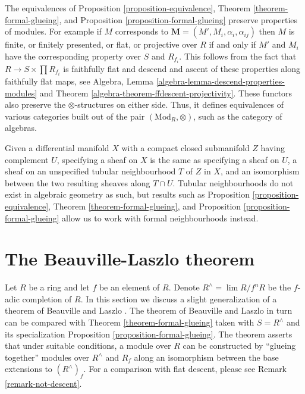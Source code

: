 \begin{remark}
\label{remark-formal-glueing-algebras}
The equivalences of
Proposition \ref{proposition-equivalence},
Theorem \ref{theorem-formal-glueing}, and
Proposition \ref{proposition-formal-glueing}
preserve properties of modules. For example if
$M$ corresponds to $\mathbf{M} = (M', M_i, \alpha_i, \alpha_{ij})$
then $M$ is finite, or finitely presented, or flat, or projective over $R$
if and only if $M'$ and $M_i$ have the corresponding property
over $S$ and $R_{f_i}$. This follows from the fact that
$R \to S \times \prod R_{f_i}$ is faithfully flat and
descend and ascent of these properties along faithfully flat maps, see
Algebra, Lemma \ref{algebra-lemma-descend-properties-modules} and
Theorem \ref{algebra-theorem-ffdescent-projectivity}.
These functors also preserve the $\otimes$-structures on either side.
Thus, it defines equivalences of various categories
built out of the pair $(\text{Mod}_R, \otimes)$, such as the category of
algebras.
\end{remark}

\begin{remark}
\label{remark-topological-analogue}
Given a differential manifold $X$ with a compact closed submanifold $Z$
having complement $U$, specifying a sheaf on $X$ is the same as specifying
a sheaf on $U$, a sheaf on an unspecified tubular neighbourhood $T$ of $Z$ in
$X$, and an isomorphism between the two resulting sheaves along $T \cap U$.
Tubular neighbourhoods do not exist in algebraic geometry as such, but
results such as
Proposition \ref{proposition-equivalence},
Theorem \ref{theorem-formal-glueing}, and
Proposition \ref{proposition-formal-glueing}
allow us to work with formal neighbourhoods instead.
\end{remark}






\section{The Beauville-Laszlo theorem}
\label{section-beauville-laszlo}

\noindent
Let $R$ be a ring and let $f$ be an element of $R$. Denote
$R^\wedge = \lim R/f^n R$ be the $f$-adic completion of $R$.
In this section we discuss a slight generalization of
a theorem of Beauville and Laszlo \cite{Beauville-Laszlo}.
The theorem of Beauville and Laszlo in turn can be compared with
Theorem \ref{theorem-formal-glueing} taken with $S = R^\wedge$ and
its specialization Proposition \ref{proposition-formal-glueing}.
The theorem asserts that under suitable conditions, a module over 
$R$ can be constructed by ``glueing together'' modules over
$R^\wedge$ and $R_f$ along an isomorphism between the
base extensions to  $(R^\wedge)_f$.
For a comparison with flat descent, please see
Remark \ref{remark-not-descent}.

